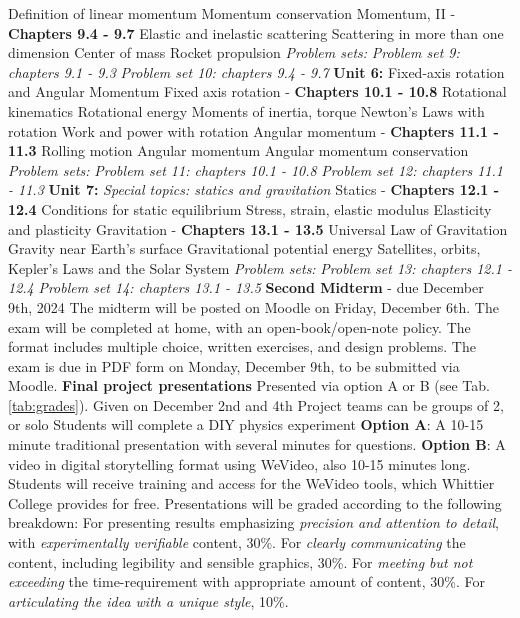\documentclass[10pt]{article}
\begin{document}
\begin{outline}[enumerate]
\3 Definition of linear momentum
\3 Momentum conservation
\2 Momentum, II - \textbf{Chapters 9.4 - 9.7}
\3 Elastic and inelastic scattering
\3 Scattering in more than one dimension
\3 Center of mass
\3 Rocket propulsion
\2 \textit{Problem sets:}
\3 \textit{Problem set 9: chapters 9.1 - 9.3}
\3 \textit{Problem set 10: chapters 9.4 - 9.7}
\1 \textbf{Unit 6:} Fixed-axis rotation and Angular Momentum
\2 Fixed axis rotation - \textbf{Chapters 10.1 - 10.8}
\3 Rotational kinematics
\3 Rotational energy
\3 Moments of inertia, torque
\3 Newton's Laws with rotation
\3 Work and power with rotation
\2 Angular momentum - \textbf{Chapters 11.1 - 11.3}
\3 Rolling motion
\3 Angular momentum
\3 Angular momentum conservation
\2 \textit{Problem sets:}
\3 \textit{Problem set 11: chapters 10.1 - 10.8}
\3 \textit{Problem set 12: chapters 11.1 - 11.3}
\1 \textbf{Unit 7:} \textit{Special topics: statics and gravitation}
\2 Statics - \textbf{Chapters 12.1 - 12.4}
\3 Conditions for static equilibrium
\3 Stress, strain, elastic modulus
\3 Elasticity and plasticity
\2 Gravitation - \textbf{Chapters 13.1 - 13.5}
\3 Universal Law of Gravitation
\3 Gravity near Earth's surface
\3 Gravitational potential energy
\3 Satellites, orbits, Kepler's Laws and the Solar System
\2 \textit{Problem sets:}
\3 \textit{Problem set 13: chapters 12.1 - 12.4}
\3 \textit{Problem set 14: chapters 13.1 - 13.5}
\1 \textbf{Second Midterm} - due December 9th, 2024
\2 The midterm will be posted on Moodle on Friday, December 6th.
\2 The exam will be completed at home, with an open-book/open-note policy.  The format includes multiple choice, written exercises, and design problems.
\2 The exam is due in PDF form on Monday, December 9th, to be submitted via Moodle.
\1 \textbf{Final project presentations}
\2 Presented via option A or B (see Tab. \ref{tab:grades}).
\2 Given on December 2nd and 4th
\2 Project teams can be groups of 2, or solo
\2 Students will complete a DIY physics experiment
\2 \textbf{Option A}: A 10-15 minute traditional presentation with several minutes for questions.
\2 \textbf{Option B}: A video in digital storytelling format using WeVideo, also 10-15 minutes long.
\2 Students will receive training and access for the WeVideo tools, which Whittier College provides for free.
\2 Presentations will be graded according to the following breakdown:
\3 For presenting results emphasizing \textit{precision and attention to detail}, with \textit{experimentally verifiable} content, 30\%.
\3 For \textit{clearly communicating} the content, including legibility and sensible graphics, 30\%.
\3 For \textit{meeting but not exceeding} the time-requirement with appropriate amount of content, 30\%.
\3 For \textit{articulating the idea with a unique style}, 10\%.
\end{outline}
\end{document}
